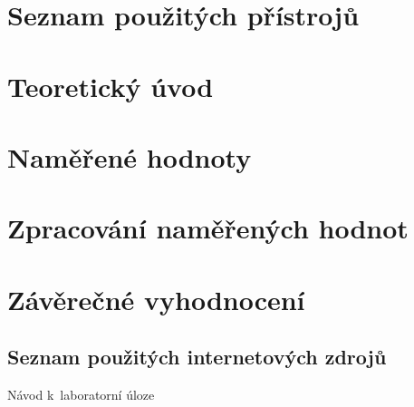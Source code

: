 \documentclass[a4paper,12pt]{article}   %
\begin{document}
\section{Seznam použitých přístrojů}
\label{chap:seznam_pristroju}



\section{Teoretický úvod}
\label{chap:teoreticky_uvod}



\section{Naměřené hodnoty}
\label{chap:namerene_hodnoty}



\section{Zpracování naměřených hodnot}
\label{chap:zpracovani_hodnot}



\section{Závěrečné vyhodnocení}
\label{chap:zaver}



\clearpage
\renewcommand{\refname}{Seznam použité literatury a~zdrojů informací} 

\begin{thebibliography}{99}

\subsection*{Seznam použitých internetových zdrojů}
     Návod k~laboratorní úloze
    
\end{thebibliography}
\end{document}
